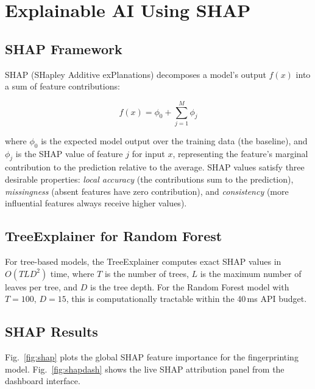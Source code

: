 \documentclass[conference]{IEEEtran}
\begin{document}
\section{Explainable AI Using SHAP}
\label{sec:shap}

\subsection{SHAP Framework}

SHAP (SHapley Additive exPlanations) \cite{lundberg2017unified} decomposes a
model's output $f(x)$ into a sum of feature contributions:

\begin{equation}
    f(x) = \phi_0 + \sum_{j=1}^{M} \phi_j
    \label{eq:shap}
\end{equation}

where $\phi_0$ is the expected model output over the training data
(the baseline), and $\phi_j$ is the SHAP value of feature $j$ for
input $x$, representing the feature's marginal contribution to the
prediction relative to the average. SHAP values satisfy three desirable
properties: \textit{local accuracy} (the contributions sum to the
prediction), \textit{missingness} (absent features have zero contribution),
and \textit{consistency} (more influential features always receive
higher values).

\subsection{TreeExplainer for Random Forest}

For tree-based models, the TreeExplainer \cite{lundberg2020local} computes
exact SHAP values in $O(TLD^2)$ time, where $T$ is the number of trees, $L$
is the maximum number of leaves per tree, and $D$ is the tree depth. For the
Random Forest model with $T=100$, $D=15$, this is computationally tractable
within the 40\,ms API budget.

\subsection{SHAP Results}

Fig.~\ref{fig:shap} plots the global SHAP feature importance for the
fingerprinting model. Fig.~\ref{fig:shapdash} shows the live SHAP attribution
panel from the dashboard interface.
\end{document}
